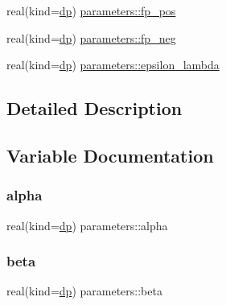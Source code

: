 \begin{DoxyCompactItemize}
\item 
real(kind=\mbox{\hyperlink{namespaceparameters_a52f8c6351fd79345d8811e065bcbbb37}{dp}}) \mbox{\hyperlink{group__BSK__EXTRA__PARS_ga5e544dc32f83cdba34677a29c028ef40}{parameters\+::fp\+\_\+pos}}
\item 
real(kind=\mbox{\hyperlink{namespaceparameters_a52f8c6351fd79345d8811e065bcbbb37}{dp}}) \mbox{\hyperlink{group__BSK__EXTRA__PARS_ga6ed17804a32c9e04ddd4c244258b8610}{parameters\+::fp\+\_\+neg}}
\item 
real(kind=\mbox{\hyperlink{namespaceparameters_a52f8c6351fd79345d8811e065bcbbb37}{dp}}) \mbox{\hyperlink{group__BSK__EXTRA__PARS_ga383b5412e8499ce22ba113c539966123}{parameters\+::epsilon\+\_\+lambda}}
\end{DoxyCompactItemize}


\subsection{Detailed Description}


\subsection{Variable Documentation}
\mbox{\label{group__BSK__EXTRA__PARS_ga8490c300b1682aacdb076ab6349e11b0}} 
\subsubsection{\texorpdfstring{alpha}{alpha}}
{\footnotesize\ttfamily real(kind=\mbox{\hyperlink{namespaceparameters_a52f8c6351fd79345d8811e065bcbbb37}{dp}}) parameters\+::alpha}

\mbox{\label{group__BSK__EXTRA__PARS_ga7c930f664bb545cbbdf20ca315bd20d8}} 
\subsubsection{\texorpdfstring{beta}{beta}}
{\footnotesize\ttfamily real(kind=\mbox{\hyperlink{namespaceparameters_a52f8c6351fd79345d8811e065bcbbb37}{dp}}) parameters\+::beta}

